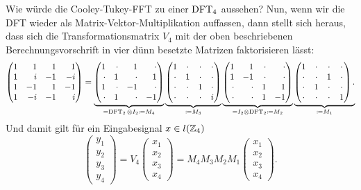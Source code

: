 Wie würde die Cooley-Tukey-FFT zu einer $ \operatorname{DFT}_{4} $ aussehen? Nun, wenn wir die DFT wieder als
Matrix-Vektor-Multiplikation auffassen, dann stellt sich heraus, dass sich die Transformationsmatrix
$ V_{4} $ mit der oben beschriebenen Berechnungsvorschrift in vier dünn besetzte Matrizen 
faktorisieren lässt:
\[
\begin{pmatrix*}[r]
      1 &  1 &  1 &  1 \\
      1 &  i & -1 & -i \\
      1 & -1 &  1 & -1 \\
      1 & -i & -1 & i
    \end{pmatrix*}
=
\underbrace{
\begin{pmatrix*}[r]
1 & \cdot & 1 & \cdot \\ \cdot & 1 & \cdot & 1 \\ 1 & \cdot & -1 & \cdot \\ \cdot & 1 & \cdot & -1
\end{pmatrix*}
}_{= \DFT_{2} \otimes I_{2} \coloneqq M_{4}}
\underbrace{
\begin{pmatrix}
1 & \cdot & \cdot & \cdot \\ \cdot & 1 & \cdot & \cdot \\ \cdot & \cdot & 1 & \cdot \\ \cdot & 
\cdot & \cdot & i
\end{pmatrix}
}_{\coloneqq M_{3}}
\underbrace{
\begin{pmatrix*}[r]
1 & 1 & \cdot & \cdot \\ 1 & -1 & \cdot & \cdot \\ \cdot & \cdot & 1 & 1 \\ \cdot & \cdot & 1 & -1
\end{pmatrix*}
}_{= I_{2} \otimes \DFT_{2} \coloneqq M_{2}}
\underbrace{
\begin{pmatrix}
1 & \cdot & \cdot & \cdot \\ \cdot & \cdot & 1 & \cdot \\ \cdot & 1 & \cdot & \cdot \\ \cdot & 
\cdot & \cdot & 1
\end{pmatrix}.
}_{\coloneqq M_{1}}
\]
Und damit gilt für ein Eingabesignal $ x \in l(\mathbb{Z}_{4}) $
\[
  \begin{pmatrix}
  y_{1} \\ y_{2} \\ y_{3} \\ y_{4}
  \end{pmatrix}
  =
  V_{4}   \begin{pmatrix}
    x_{1} \\ x_{2} \\ x_{3} \\ x_{4}
  \end{pmatrix}
  = 
  M_{4} M_{3} M_{2} M_{1}   \begin{pmatrix}
      x_{1} \\ x_{2} \\ x_{3} \\ x_{4}
    \end{pmatrix}.
\]

